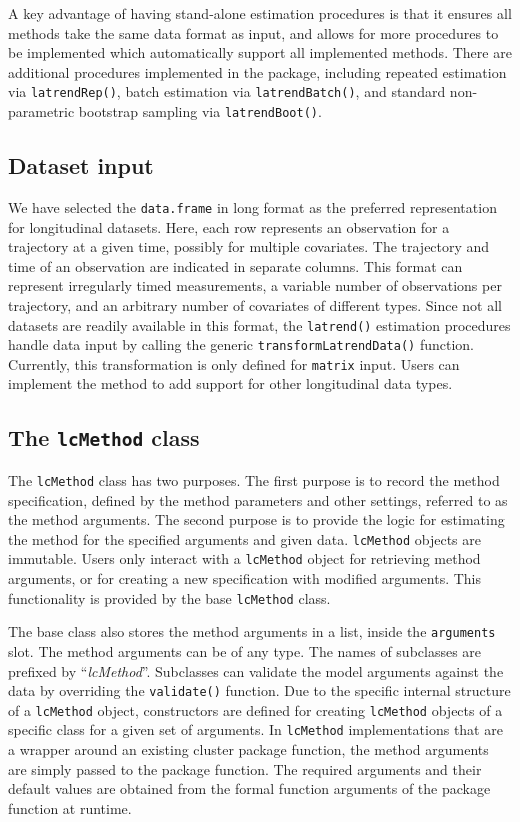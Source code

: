 A key advantage of having stand-alone estimation procedures is that it ensures all methods take the same data format as input, and allows for more procedures to be implemented which automatically support all implemented methods. There are additional procedures implemented in the package, including repeated estimation via \texttt{latrendRep()}, batch estimation via \texttt{latrendBatch()}, and standard non-parametric bootstrap sampling via \texttt{latrendBoot()}.

\subsection{Dataset input}\label{dataset-input}

We have selected the \texttt{data.frame} in long format as the preferred representation for longitudinal datasets. Here, each row represents an observation for a trajectory at a given time, possibly for multiple covariates. The trajectory and time of an observation are indicated in separate columns. This format can represent irregularly timed measurements, a variable number of observations per trajectory, and an arbitrary number of covariates of different types. Since not all datasets are readily available in this format, the \texttt{latrend()} estimation procedures handle data input by calling the generic \texttt{transformLatrendData()} function. Currently, this transformation is only defined for \texttt{matrix} input. Users can implement the method to add support for other longitudinal data types.

\subsection{\texorpdfstring{The \texttt{lcMethod} class}{The lcMethod class}}\label{subsec:lcmethod}

The \texttt{lcMethod} class has two purposes. The first purpose is to record the method specification, defined by the method parameters and other settings, referred to as the method arguments. The second purpose is to provide the logic for estimating the method for the specified arguments and given data. \texttt{lcMethod} objects are immutable. Users only interact with a \texttt{lcMethod} object for retrieving method arguments, or for creating a new specification with modified arguments. This functionality is provided by the base \texttt{lcMethod} class.

The base class also stores the method arguments in a list, inside the \texttt{arguments} slot. The method arguments can be of any type. The names of subclasses are prefixed by ``\emph{lcMethod}''. Subclasses can validate the model arguments against the data by overriding the \texttt{validate()} function. Due to the specific internal structure of a \texttt{lcMethod} object, constructors are defined for creating \texttt{lcMethod} objects of a specific class for a given set of arguments. In \texttt{lcMethod} implementations that are a wrapper around an existing cluster package function, the method arguments are simply passed to the package function. The required arguments and their default values are obtained from the formal function arguments of the package function at runtime.

